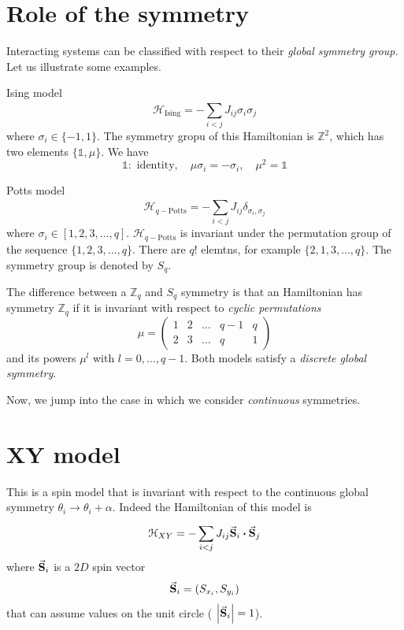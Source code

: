 \documentclass[../main/main.tex]{subfiles}
\begin{document}
\section{Role of the symmetry}
Interacting systems can be classified with respect to their \emph{global symmetry group}. Let us illustrate some examples.
\begin{example}{Ising model}{}
  \begin{equation}
    \mathcal{H}_{\text{Ising}} = - \sum_{i<j}^{} J_{ij} \sigma _i \sigma _j
  \end{equation}
  where \( \sigma _i \in \{ -1,1 \}   \). The symmetry gropu of this Hamiltonian is \( \mathbb{Z}^2 \), which has two elements \( \{ \mathbb{1}, \mu  \}   \). We have
  \begin{equation}
    \mathbb{1}: \text{ identity}, \quad \mu \sigma _i = - \sigma _i, \quad \mu ^2 = \mathbb{1}
  \end{equation}
\end{example}
\begin{example}{Potts model}{}
  \begin{equation}
    \mathcal{H}_{q- \text{Potts}} = - \sum_{i<j}^{} J_{ij} \delta _{\sigma _i, \sigma _j}
  \end{equation}
  where \( \sigma _i \in [1,2,3,\dots,q] \). \( \mathcal{H}_{q- \text{Potts}} \)  is invariant under the permutation group of the sequence \( \{ 1,2,3,\dots,q \}   \). There are \( q! \) elemtns, for example \( \{ 2,1,3,\dots,q \}   \). The symmetry group is denoted by \( S_q \).
\end{example}
\begin{remark}
The difference between a \( \mathbb{Z}_q \) and \( S_q \) symmetry is that an Hamiltonian has symmetry \( \mathbb{Z}_q \) if it is invariant with respect to \emph{cyclic permutations}
\begin{equation}
  \mu = \begin{pmatrix}
    1 & 2 & \dots & q-1 & q \\
    2 & 3 & \dots & q & 1
  \end{pmatrix}
\end{equation}
and its powers \( \mu ^l \) with \( l=0, \dots, q-1 \). Both models satisfy a \emph{discrete global symmetry}.
\end{remark}
Now, we jump into the case in which we consider \emph{continuous} symmetries.

\section{XY model}
This is a spin model that is invariant with respect to the continuous global symmetry
\( \theta _i \rightarrow \theta _i + \alpha  \).
Indeed the Hamiltonian of this model is
\begin{equation}
  \mathcal{H}_{XY} = - \sum_{i<j}^{} J_{ij} \va{S}_i \vdot \va{S}_j
\end{equation}
where \(\va{S}_i  \) is a \( 2D \) spin vector
\begin{equation}
  \va{S}_i = (S_{x_i}, S_{y_i})
\end{equation}
that can assume values on the unit circle ( \(  \abs{\va{S}_i} =1 \)).
\end{document}
